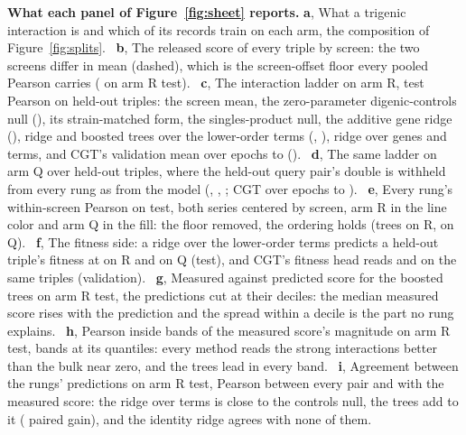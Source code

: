 \noindent\textbf{What each panel of Figure~\ref{fig:sheet} reports.}
\textbf{a}, What a trigenic interaction is and which of its records train on each arm,
the composition of Figure~\ref{fig:splits}. \,
\textbf{b}, The released score of every triple by screen: the two screens differ in mean
(dashed), which is the screen-offset floor every pooled Pearson carries
(\gloRNZeroscreenmeantest{} on arm R test). \,
\textbf{c}, The interaction ladder on arm R, test Pearson on \gnRTest{} held-out triples:
the screen mean, the zero-parameter digenic-controls null (\gloRNOnemultquerydoubletest{}),
its strain-matched form, the singles-product null, the additive gene ridge
(\gloRBOneadditivegenetest{}), ridge and boosted trees over the lower-order terms
(\gloRLOneridgelowerordertest{}, \gloRLTwohgblowerordertest{}), ridge over genes and
terms, and CGT's validation mean over epochs \gcgtRFirstEpoch{} to \gcgtRLastEpoch{}
(\gcgtRValWindow{}). \,
\textbf{d}, The same ladder on arm Q over \gnQTest{} held-out triples, where the
held-out query pair's double is withheld from every rung as from the model
(\gloQNOnemultquerydoubletest{}, \gloQBOneadditivegenetest{}, \gloQLTwohgblowerordertest{};
CGT \gcgtQValWindow{} over epochs \gcgtQFirstEpoch{} to \gcgtQLastEpoch{}).
\,
\textbf{e}, Every rung's within-screen Pearson on test, both series centered by screen,
arm R in the line color and arm Q in the fill: the floor removed, the ordering holds
(trees \gloRLTwohgblowerordertestWithin{} on R, \gloQLTwohgblowerordertestWithin{} on Q).
\,
\textbf{f}, The fitness side: a ridge over the lower-order terms predicts a held-out
triple's fitness at \gloRFOneridgelowerorderfitnesstest{} on R and
\gloQFOneridgelowerorderfitnesstest{} on Q (test), and CGT's fitness head reads
\gfitRCgtValWindow{} and \gfitQCgtValWindow{} on the same triples (validation).
\,
\textbf{g}, Measured against predicted score for the boosted trees on arm R test, the
predictions cut at their deciles: the median measured score rises with the prediction
and the spread within a decile is the part no rung explains. \,
\textbf{h}, Pearson inside bands of the measured score's magnitude on arm R test, bands at
its quantiles: every method reads the strong interactions better than the bulk near
zero, and the trees lead in every band. \,
\textbf{i}, Agreement between the rungs' predictions on arm R test, Pearson between every
pair and with the measured score: the ridge over terms is close to the controls null,
the trees add to it (\gpairRNOnemultquerydoubleLTwohgblowerorder{} paired gain), and the
identity ridge agrees with none of them. \,

